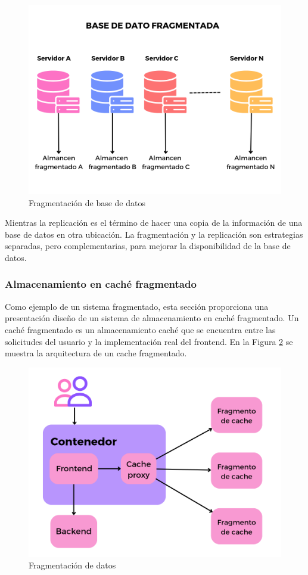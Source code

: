  	\begin{figure}    
 		\begin{center}%
 	\includegraphics[width=0.8\linewidth] {9/6.png} 
 	\caption{Fragmentaci\'on de base de datos}
 	\label{fig:fragmen}
 \end{center}
  \end{figure}
 
 Mientras la replicación  es el   término de  hacer una copia  de la información de una base de datos en otra ubicación. La fragmentación y la replicación son estrategias separadas, pero complementarias, para mejorar la disponibilidad de la base de datos.  
 
 \subsubsection{Almacenamiento en  caché fragmentado}
 
 Como ejemplo de  un sistema fragmentado, esta sección proporciona una presentaci\'on  diseño de un sistema de almacenamiento en caché fragmentado. Un caché fragmentado  \cite{Burns2018} es un almacenamiento  caché que se encuentra entre las solicitudes del usuario y la implementación real del frontend.  En la Figura \ref{fig:fragmen-cache} se muestra la arquitectura de un cache fragmentado.
 
 
 
 \begin{figure}    
 	\begin{center}%
 	\includegraphics[width=0.8\linewidth] {9/7.png} 
 	\caption{Fragmentaci\'on de datos}
 	\label{fig:fragmen-cache}
 \end{center} 
 \end{figure}
  
